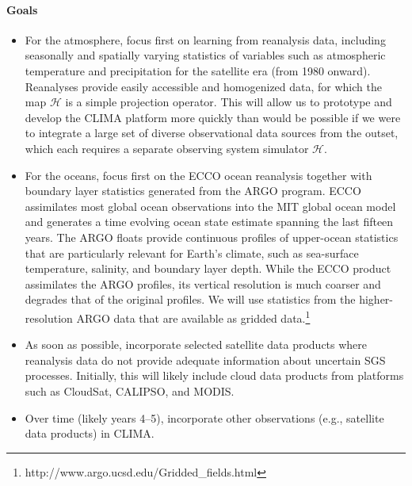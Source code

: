 \documentclass{article}
\begin{document}
\paragraph{Goals}
\begin{itemize}
    \item For the atmosphere, focus first on learning from reanalysis data, including seasonally and spatially varying statistics of variables such as atmospheric temperature and precipitation for the satellite era (from 1980 onward). Reanalyses provide easily accessible and homogenized data, for which the map $\mathcal{H}$ is a simple projection operator. This will allow us to prototype and develop the CLIMA platform more quickly than would be possible if we were to integrate a large set of diverse observational data sources from the outset, which each requires a separate observing system simulator $\mathcal{H}$.
    \item For the oceans, focus first on the ECCO ocean reanalysis together with boundary layer statistics generated from the ARGO program. ECCO assimilates most global ocean observations into the MIT global ocean model and generates a time evolving ocean state estimate spanning the last fifteen years. The ARGO floats provide continuous profiles of upper-ocean statistics that are particularly relevant for Earth's climate, such as sea-surface temperature, salinity, and boundary layer depth. While the ECCO product assimilates the ARGO profiles, its vertical resolution is much coarser and degrades that of the original profiles. We will use statistics from the higher-resolution ARGO data that are available as gridded data.\footnote{http://www.argo.ucsd.edu/Gridded\_fields.html}
    \item As soon as possible, incorporate selected satellite data products where reanalysis data do not provide adequate information about uncertain SGS processes. Initially, this will likely include cloud data products from platforms such as CloudSat, CALIPSO, and MODIS.
    \item Over time (likely years 4--5), incorporate other observations (e.g., satellite data products) in CLIMA. 
\end{itemize}
\end{document}
